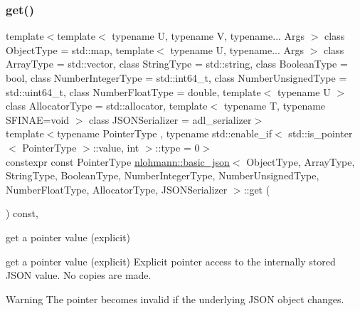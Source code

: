 \subsubsection{\texorpdfstring{get()}{get()}\hspace{0.1cm}{\footnotesize\ttfamily [5/5]}}
{\footnotesize\ttfamily template$<$template$<$ typename U, typename V, typename... Args $>$ class Object\+Type = std\+::map, template$<$ typename U, typename... Args $>$ class Array\+Type = std\+::vector, class String\+Type  = std\+::string, class Boolean\+Type  = bool, class Number\+Integer\+Type  = std\+::int64\+\_\+t, class Number\+Unsigned\+Type  = std\+::uint64\+\_\+t, class Number\+Float\+Type  = double, template$<$ typename U $>$ class Allocator\+Type = std\+::allocator, template$<$ typename T, typename S\+F\+I\+N\+A\+E=void $>$ class J\+S\+O\+N\+Serializer = adl\+\_\+serializer$>$ \\
template$<$typename Pointer\+Type , typename std\+::enable\+\_\+if$<$ std\+::is\+\_\+pointer$<$ Pointer\+Type $>$\+::value, int $>$\+::type  = 0$>$ \\
constexpr const Pointer\+Type \mbox{\hyperlink{classnlohmann_1_1basic__json}{nlohmann\+::basic\+\_\+json}}$<$ Object\+Type, Array\+Type, String\+Type, Boolean\+Type, Number\+Integer\+Type, Number\+Unsigned\+Type, Number\+Float\+Type, Allocator\+Type, J\+S\+O\+N\+Serializer $>$\+::get (\begin{DoxyParamCaption}{ }\end{DoxyParamCaption}) const\hspace{0.3cm}{\ttfamily [inline]}, {\ttfamily [noexcept]}}



get a pointer value (explicit) 

get a pointer value (explicit) Explicit pointer access to the internally stored J\+S\+ON value. No copies are made.

\begin{DoxyWarning}{Warning}
The pointer becomes invalid if the underlying J\+S\+ON object changes.
\end{DoxyWarning}


